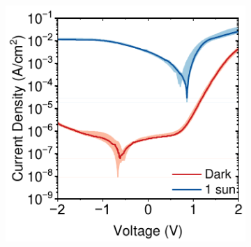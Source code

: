 \begin{figure}[htbp]
\begin{subfigure}[t]{0.45\textwidth}
        \includegraphics[width=\textwidth]{chapters/material_properties/images/High_yield_median.pdf} %
        \caption{}
        \label{fig:ch2:high_yield_median}
    \end{subfigure}

    \vspace{1em} %


\end{figure}
